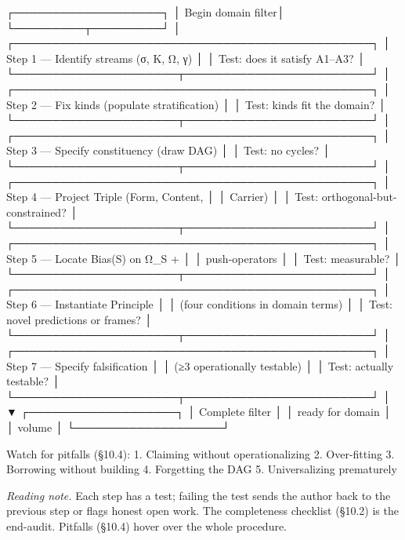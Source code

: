 \documentclass[11pt, openany]{book}
\begin{document}
\begin{Code}
              ┌───────────────────┐
              │ Begin domain filter│
              └─────────┬─────────┘
                        │
  ┌──────────────────────────────────────────────┐
  │ Step 1 — Identify streams (σ, K, Ω, γ)        │
  │   Test: does it satisfy A1–A3?                │
  └─────────────────────┬────────────────────────┘
                        │
  ┌──────────────────────────────────────────────┐
  │ Step 2 — Fix kinds (populate stratification)  │
  │   Test: kinds fit the domain?                 │
  └─────────────────────┬────────────────────────┘
                        │
  ┌──────────────────────────────────────────────┐
  │ Step 3 — Specify constituency (draw DAG)      │
  │   Test: no cycles?                            │
  └─────────────────────┬────────────────────────┘
                        │
  ┌──────────────────────────────────────────────┐
  │ Step 4 — Project Triple (Form, Content,       │
  │          Carrier)                             │
  │   Test: orthogonal-but-constrained?           │
  └─────────────────────┬────────────────────────┘
                        │
  ┌──────────────────────────────────────────────┐
  │ Step 5 — Locate Bias(S) on Ω_S +              │
  │          push-operators                       │
  │   Test: measurable?                           │
  └─────────────────────┬────────────────────────┘
                        │
  ┌──────────────────────────────────────────────┐
  │ Step 6 — Instantiate Principle                │
  │          (four conditions in domain terms)    │
  │   Test: novel predictions or frames?          │
  └─────────────────────┬────────────────────────┘
                        │
  ┌──────────────────────────────────────────────┐
  │ Step 7 — Specify falsification                │
  │          (≥3 operationally testable)          │
  │   Test: actually testable?                    │
  └─────────────────────┬────────────────────────┘
                        │
                        ▼
              ┌───────────────────┐
              │  Complete filter  │
              │ ready for domain  │
              │       volume      │
              └───────────────────┘

  Watch for pitfalls (§10.4):
    1. Claiming without operationalizing
    2. Over-fitting
    3. Borrowing without building
    4. Forgetting the DAG
    5. Universalizing prematurely
\end{Code}

\textit{Reading note.} Each step has a test; failing the test sends the author back to the previous step or flags honest open work. The completeness checklist (§10.2) is the end-audit. Pitfalls (§10.4) hover over the whole procedure.
\end{document}
